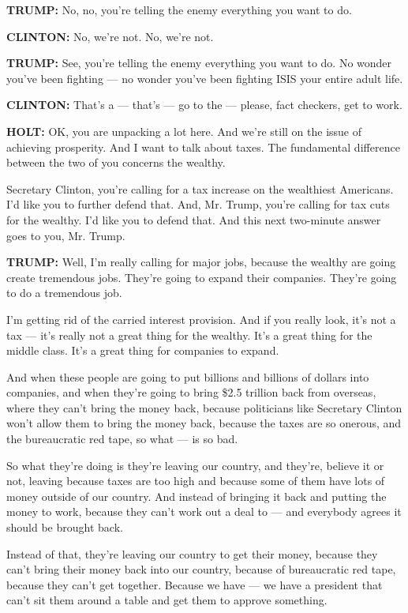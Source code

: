 \textbf{TRUMP:} No, no, you're telling the enemy everything you want to
do.

\textbf{CLINTON:} No, we're not. No, we're not.

\textbf{TRUMP:} See, you're telling the enemy everything you want to do.
No wonder you've been fighting --- no wonder you've been fighting ISIS
your entire adult life.

\textbf{CLINTON:} That's a --- that's --- go to the --- please, fact
checkers, get to work.

\textbf{HOLT:} OK, you are unpacking a lot here. And we're still on the
issue of achieving prosperity. And I want to talk about taxes. The
fundamental difference between the two of you concerns the wealthy.

Secretary Clinton, you're calling for a tax increase on the wealthiest
Americans. I'd like you to further defend that. And, Mr. Trump, you're
calling for tax cuts for the wealthy. I'd like you to defend that. And
this next two-minute answer goes to you, Mr. Trump.

\textbf{TRUMP:} Well, I'm really calling for major jobs, because the
wealthy are going create tremendous jobs. They're going to expand their
companies. They're going to do a tremendous job.

I'm getting rid of the carried interest provision. And if you really
look, it's not a tax --- it's really not a great thing for the wealthy.
It's a great thing for the middle class. It's a great thing for
companies to expand.

And when these people are going to put billions and billions of dollars
into companies, and when they're going to bring \$2.5 trillion back from
overseas, where they can't bring the money back, because politicians
like Secretary Clinton won't allow them to bring the money back, because
the taxes are so onerous, and the bureaucratic red tape, so what --- is
so bad.

So what they're doing is they're leaving our country, and they're,
believe it or not, leaving because taxes are too high and because some
of them have lots of money outside of our country. And instead of
bringing it back and putting the money to work, because they can't work
out a deal to --- and everybody agrees it should be brought back.

Instead of that, they're leaving our country to get their money, because
they can't bring their money back into our country, because of
bureaucratic red tape, because they can't get together. Because we have
--- we have a president that can't sit them around a table and get them
to approve something.

